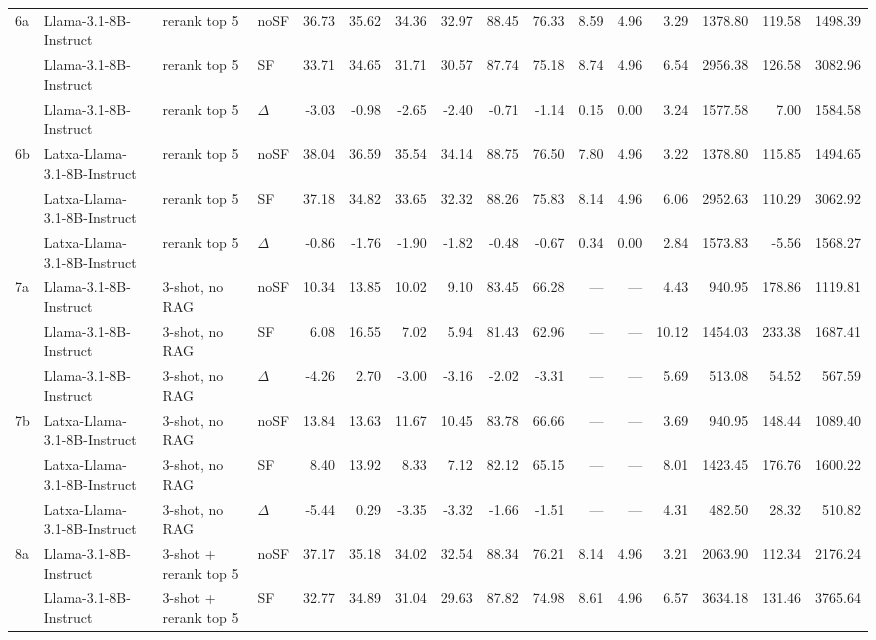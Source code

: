 \begin{landscape}
\begin{footnotesize}
\begin{longtable}{l l l l r r r r r r r r r r r r}
\midrule
\rowcolor{tabhighlight}6a & Llama-3.1-8B-Instruct & rerank top 5 & noSF & 36.73 & 35.62 & 34.36 & 32.97 & 88.45 & 76.33 & 8.59 & 4.96 & 3.29 & 1378.80 & 119.58 & 1498.39 \\
 & Llama-3.1-8B-Instruct & rerank top 5 & SF & 33.71 & 34.65 & 31.71 & 30.57 & 87.74 & 75.18 & 8.74 & 4.96 & 6.54 & 2956.38 & 126.58 & 3082.96 \\
 & Llama-3.1-8B-Instruct & rerank top 5 & $\Delta$ & -3.03 & -0.98 & -2.65 & -2.40 & -0.71 & -1.14 & 0.15 & 0.00 & 3.24 & 1577.58 & 7.00 & 1584.58 \\
6b & Latxa-Llama-3.1-8B-Instruct & rerank top 5 & noSF & 38.04 & 36.59 & 35.54 & 34.14 & 88.75 & 76.50 & 7.80 & 4.96 & 3.22 & 1378.80 & 115.85 & 1494.65 \\
 & Latxa-Llama-3.1-8B-Instruct & rerank top 5 & SF & 37.18 & 34.82 & 33.65 & 32.32 & 88.26 & 75.83 & 8.14 & 4.96 & 6.06 & 2952.63 & 110.29 & 3062.92 \\
 & Latxa-Llama-3.1-8B-Instruct & rerank top 5 & $\Delta$ & -0.86 & -1.76 & -1.90 & -1.82 & -0.48 & -0.67 & 0.34 & 0.00 & 2.84 & 1573.83 & -5.56 & 1568.27 \\
\midrule
7a & Llama-3.1-8B-Instruct & 3-shot, no RAG & noSF & 10.34 & 13.85 & 10.02 & 9.10 & 83.45 & 66.28 & --- & --- & 4.43 & 940.95 & 178.86 & 1119.81 \\
 & Llama-3.1-8B-Instruct & 3-shot, no RAG & SF & 6.08 & 16.55 & 7.02 & 5.94 & 81.43 & 62.96 & --- & --- & 10.12 & 1454.03 & 233.38 & 1687.41 \\
 & Llama-3.1-8B-Instruct & 3-shot, no RAG & $\Delta$ & -4.26 & 2.70 & -3.00 & -3.16 & -2.02 & -3.31 & --- & --- & 5.69 & 513.08 & 54.52 & 567.59 \\
7b & Latxa-Llama-3.1-8B-Instruct & 3-shot, no RAG & noSF & 13.84 & 13.63 & 11.67 & 10.45 & 83.78 & 66.66 & --- & --- & 3.69 & 940.95 & 148.44 & 1089.40 \\
 & Latxa-Llama-3.1-8B-Instruct & 3-shot, no RAG & SF & 8.40 & 13.92 & 8.33 & 7.12 & 82.12 & 65.15 & --- & --- & 8.01 & 1423.45 & 176.76 & 1600.22 \\
 & Latxa-Llama-3.1-8B-Instruct & 3-shot, no RAG & $\Delta$ & -5.44 & 0.29 & -3.35 & -3.32 & -1.66 & -1.51 & --- & --- & 4.31 & 482.50 & 28.32 & 510.82 \\
\midrule
8a & Llama-3.1-8B-Instruct & 3-shot + rerank top 5 & noSF & 37.17 & 35.18 & 34.02 & 32.54 & 88.34 & 76.21 & 8.14 & 4.96 & 3.21 & 2063.90 & 112.34 & 2176.24 \\
 & Llama-3.1-8B-Instruct & 3-shot + rerank top 5 & SF & 32.77 & 34.89 & 31.04 & 29.63 & 87.82 & 74.98 & 8.61 & 4.96 & 6.57 & 3634.18 & 131.46 & 3765.64 \\

\end{longtable}
\end{footnotesize}
\end{landscape}
